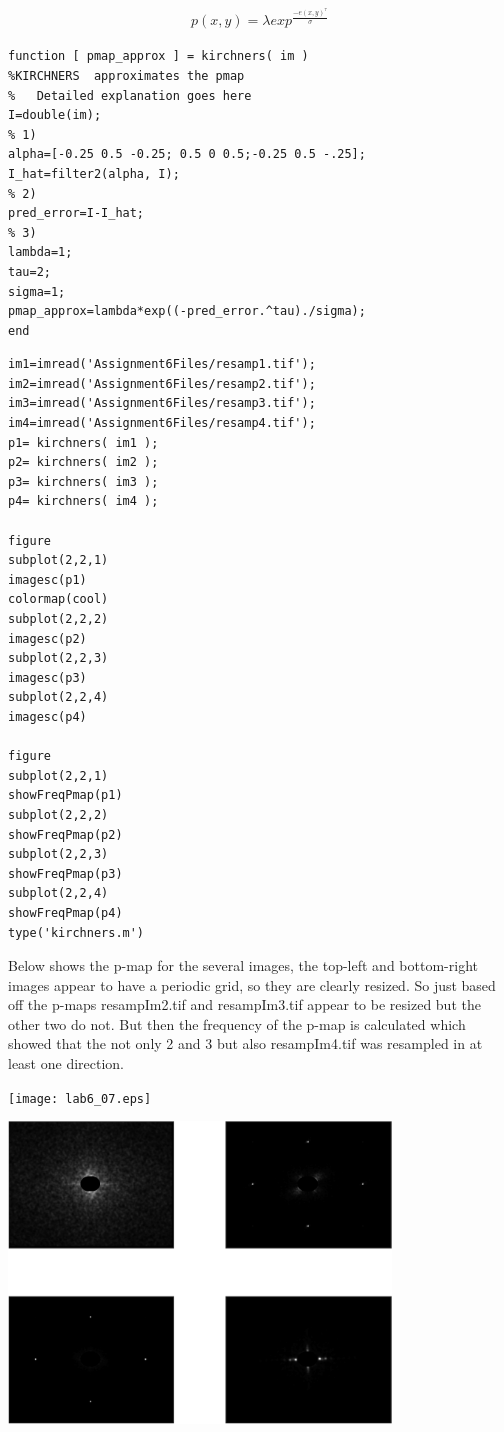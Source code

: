 \documentclass{article}
\begin{document}
\begin{align} 
	p(x,y)=\lambda exp^{\frac{-e(x,y)^\tau}{\sigma}}
\end{align}



\color{lightgray} \begin{verbatim}
function [ pmap_approx ] = kirchners( im )
%KIRCHNERS  approximates the pmap 
%   Detailed explanation goes here
I=double(im); 
% 1)
alpha=[-0.25 0.5 -0.25; 0.5 0 0.5;-0.25 0.5 -.25]; 
I_hat=filter2(alpha, I); 
% 2)
pred_error=I-I_hat; 
% 3)
lambda=1; 
tau=2; 
sigma=1; 
pmap_approx=lambda*exp((-pred_error.^tau)./sigma); 
end
\end{verbatim} 

\begin{verbatim}
im1=imread('Assignment6Files/resamp1.tif');
im2=imread('Assignment6Files/resamp2.tif');
im3=imread('Assignment6Files/resamp3.tif');
im4=imread('Assignment6Files/resamp4.tif');
p1= kirchners( im1 );
p2= kirchners( im2 );
p3= kirchners( im3 );
p4= kirchners( im4 );

figure
subplot(2,2,1)
imagesc(p1)
colormap(cool)
subplot(2,2,2)
imagesc(p2)
subplot(2,2,3)
imagesc(p3)
subplot(2,2,4)
imagesc(p4)

figure
subplot(2,2,1)
showFreqPmap(p1)
subplot(2,2,2)
showFreqPmap(p2)
subplot(2,2,3)
showFreqPmap(p3)
subplot(2,2,4)
showFreqPmap(p4)
type('kirchners.m')
\end{verbatim}\color{black}
    

Below shows the p-map for the several images, the top-left and bottom-right
images appear to have a periodic grid, so they are clearly resized. So just
based off the p-maps resampIm2.tif and resampIm3.tif appear to be resized
but the other two do not. But then the frequency of the p-map is calculated
which showed that the not only 2 and 3 but also resampIm4.tif was resampled
in at least one direction. 


\texttt{[image: lab6\_07.eps]}

\includegraphics [width=4in]{lab6_08.eps}
\end{document}
